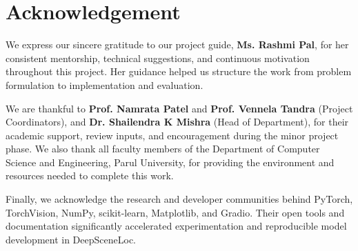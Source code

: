 \chapter*{Acknowledgement}

We express our sincere gratitude to our project guide, \textbf{Ms. Rashmi Pal}, for her consistent mentorship, technical suggestions, and continuous motivation throughout this project. Her guidance helped us structure the work from problem formulation to implementation and evaluation.

We are thankful to \textbf{Prof. Namrata Patel} and \textbf{Prof. Vennela Tandra} (Project Coordinators), and \textbf{Dr. Shailendra K Mishra} (Head of Department), for their academic support, review inputs, and encouragement during the minor project phase. We also thank all faculty members of the Department of Computer Science and Engineering, Parul University, for providing the environment and resources needed to complete this work.

Finally, we acknowledge the research and developer communities behind PyTorch, TorchVision, NumPy, scikit-learn, Matplotlib, and Gradio. Their open tools and documentation significantly accelerated experimentation and reproducible model development in DeepSceneLoc.

